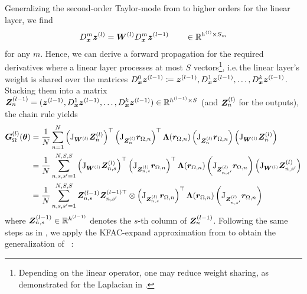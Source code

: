 Generalizing the second-order Taylor-mode from  to higher orders for the linear layer, we find
\begin{align}
  D_{\bm{x}}^m {\bm{z}}^{(l)} = {\bm{W}}^{(l)}D_{\bm{x}}^m {\bm{z}}^{(l-1)}
  \qquad \in {\mathbb{R}}^{h^{(l)} \times S_{m}}
\end{align}
for any $m$.
Hence, we can derive a forward propagation for the required derivatives where a linear layer processes at most $S$ vectors\footnote{Depending on the linear operator, one may reduce weight sharing, as demonstrated for the Laplacian in .}, i.e.\,the linear layer's weight is shared over the matrices $D^{0}_{\bm{x}} {\bm{z}}^{(l-1)} \coloneqq {\bm{z}}^{(l-1)}, D_{\bm{x}}^1 {\bm{z}}^{(l-1)}, \dots, D_{\bm{x}}^k {\bm{z}}^{(l-1)}$. Stacking them into a matrix ${\bm{Z}}^{(l-1)}_n = ({\bm{z}}^{(l-1)}, D_{\bm{x}}^1 {\bm{z}}^{(l-1)}, \dots, D_{\bm{x}}^k {\bm{z}}^{(l-1)} ) \in {\mathbb{R}}^{h^{(l-1)} \times S}$ (and ${\bm{Z}}^{(l)}_n$ for the outputs), the chain rule yields
\begin{align*}
  \begin{split}
    {\bm{G}}^{(l)}_{\Omega}({\bm{\theta}})
    &=
      \frac{1}{N}
      \sum_{n=1}^N
      \left(\mathrm{J}_{{\bm{W}}^{(l)}} {\bm{Z}}^{(l)}_n \right)^{\top}
      \left(
      \mathrm{J}_{{\bm{Z}}^{(l)}_n} {\bm{r}}_{\Omega,n}
      \right)^{\top}
      {\bm{\Lambda}}({\bm{r}}_{\Omega,n})
      \left(
      \mathrm{J}_{{\bm{Z}}^{(l)}_n} {\bm{r}}_{\Omega,n}
      \right)
      \left(\mathrm{J}_{{\bm{W}}^{(l)}} {\bm{Z}}^{(l)}_n \right)
    \\
    &=
      \frac{1}{N}
      \sum_{n,s,s'=1}^{N,S,S}
      \left(\mathrm{J}_{{\bm{W}}^{(l)}} {\bm{Z}}^{(l)}_{n,s} \right)^{\top}
      \left(
      \mathrm{J}_{{\bm{Z}}^{(l)}_{n,s}} {\bm{r}}_{\Omega,n}
      \right)^{\top}
      {\bm{\Lambda}}({\bm{r}}_{\Omega,n})
      \left(
      \mathrm{J}_{{\bm{Z}}^{(l)}_{n,s'}} {\bm{r}}_{\Omega,n}
      \right)
      \left(\mathrm{J}_{{\bm{W}}^{(l)}} {\bm{Z}}^{(l)}_{n,s'} \right)
    \\
    &=
      \frac{1}{N}
      \sum_{n,s,s'=1}^{N,S,S}
      {\bm{Z}}^{(l-1)}_{n,s}
      {\bm{Z}}^{(l-1)\top}_{n,s'}
      \otimes
      \left(\mathrm{J}_{{\bm{Z}}^{(l)}_{n,s}} {\bm{r}}_{\Omega,n} \right)^{\top}
      {\bm{\Lambda}}({\bm{r}}_{\Omega,n})
      \left(
      \mathrm{J}_{{\bm{Z}}^{(l)}_{n,s'}} {\bm{r}}_{\Omega,n}
      \right)
  \end{split}
\end{align*}
where ${\bm{Z}}_{n,s}^{(l-1)} \in {\mathbb{R}}^{h^{(l-1)}}$ denotes the $s$-th column of ${\bm{Z}}_n^{(l-1)}$.
Following the same steps as in , we apply the KFAC-expand approximation from \cite{eschenhagen2023kroneckerfactored} to obtain the generalization of ~:

